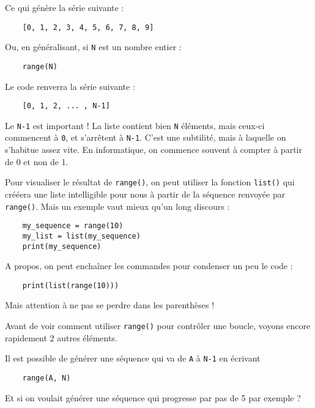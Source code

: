 Ce qui génère la série suivante :

\begin{lstlisting}
    [0, 1, 2, 3, 4, 5, 6, 7, 8, 9]
\end{lstlisting}

Ou, en généralisant, si \texttt{N} est un nombre entier :

\begin{lstlisting}
    range(N)
\end{lstlisting}

Le code renverra la série suivante :

\begin{lstlisting}
    [0, 1, 2, ... , N-1]
\end{lstlisting}

Le \texttt{N-1} est important ! La liste contient bien \texttt{N} éléments, mais ceux-ci commencent à \texttt{0}, et s'arrêtent à \texttt{N-1}. C'est une subtilité, mais à laquelle on s'habitue assez vite. En informatique, on commence souvent à compter à partir de 0 et non de 1.

Pour visualiser le résultat de \texttt{range()}, on peut utiliser la fonction \texttt{list()} qui crééera une liste intelligible pour nous à partir de la séquence renvoyée par \texttt{range()}. Mais un exemple vaut mieux qu'un long discours :

\begin{lstlisting}
    my_sequence = range(10)
    my_list = list(my_sequence)
    print(my_sequence)
\end{lstlisting}

A propos, on peut enchaîner les commandes pour condenser un peu le code :

\begin{lstlisting}
    print(list(range(10)))
\end{lstlisting}

Mais attention à ne pas se perdre dans les parenthèses !

Avant de voir comment utiliser \texttt{range()} pour contrôler une boucle, voyons encore rapidement 2 autres éléments.

Il est possible de générer une séquence qui va de \texttt{A} à \texttt{N-1} en écrivant

\begin{lstlisting}
    range(A, N)
\end{lstlisting}

Et si on voulait générer une séquence qui progresse par pas de 5 par exemple ?

